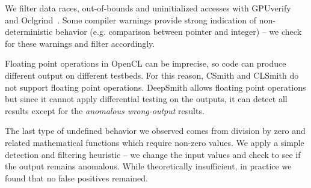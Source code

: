 We filter data races, out-of-bounds and uninitialized accesses with
GPUverify~\cite{Betts2012} and Oclgrind~\cite{Price2015}. Some compiler warnings
provide strong indication of non-deterministic behavior (e.g. comparison between
pointer and integer) -- we check for these warnings and filter accordingly.

Floating point operations in OpenCL can be imprecise, so code can produce
different output on different testbeds. For this reason, CSmith and CLSmith do
not support floating point operations. DeepSmith allows floating point
operations but since it cannot apply differential testing on the outputs, it can
detect all results except for the \emph{anomalous wrong-output} results.

The last type of undefined behavior we observed comes from division by zero and
related mathematical functions which require non-zero values. We apply a simple
detection and filtering heuristic -- we change the input values and check to see
if the output remains anomalous. While theoretically insufficient, in practice
we found that no false positives remained.
